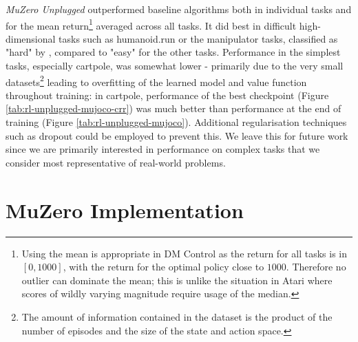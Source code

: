 \documentclass{article}
\newcommand{\mzunplugged}{\emph{MuZero Unplugged}}
\begin{document}
\mzunplugged{} outperformed baseline algorithms both in individual tasks and for the mean return\footnote{Using the mean is appropriate in DM Control as the return for all tasks is in $[0, 1000]$, with the return for the optimal policy close to $1000$. Therefore no outlier can dominate the mean; this is unlike the situation in Atari where scores of wildly varying magnitude require usage of the median.} averaged across all tasks. It did best in difficult high-dimensional tasks such as humanoid.run or the manipulator tasks, classified as "hard" by \cite{wang2020critic}, compared to "easy" for the other tasks. Performance in the simplest tasks, especially cartpole, was somewhat lower - primarily due to the very small datasets\footnote{The amount of information contained in the dataset is the product of the number of episodes and the size of the state and action space.} leading to overfitting of the learned model and value function throughout training: in cartpole, performance of the best checkpoint (Figure \ref{tab:rl-unplugged-mujoco-crr}) was much better than performance at the end of training (Figure \ref{tab:rl-unplugged-mujoco}). Additional regularisation techniques such as dropout \cite{hinton2012dropout} could be employed to prevent this. We leave this for future work since we are primarily interested in performance on complex tasks that we consider most representative of real-world problems.

\section{MuZero Implementation}
\end{document}
